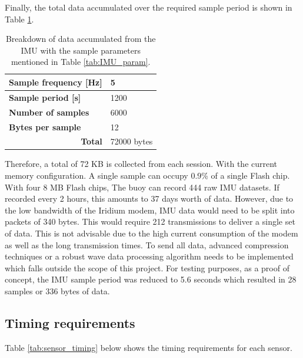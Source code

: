 Finally, the total data accumulated over the required sample period is shown in Table \ref{tab:IMU_data_total}.

\begin{table}[H]
	\centering
	\caption{Breakdown of data accumulated from the IMU with the sample parameters mentioned in Table \ref{tab:IMU_param}.}
	\setlength{\extrarowheight}{5pt}
	\begin{tabular}{ll}
		\hline
		\hline
		\textbf{Sample frequency [Hz] }  & 5\\
		\hline
		\textbf{Sample period [s]}    & 1200\\
		\hline
		\textbf{Number of samples}  & 6000 \\ 
		\hline
		\textbf{Bytes per sample}   & 12 \\
		\hline
		\hline
		\multicolumn{1}{r}{\textbf{Total}} & \multicolumn{1}{l}{72000 bytes}\\
		\cline{2-2}
	\end{tabular}
	
	\label{tab:IMU_data_total}
\end{table}

Therefore, a total of 72 KB is collected from each session. With the current memory configuration. A single sample can occupy 0.9\% of a single Flash chip. With four 8 MB Flash chips, The buoy can record 444 raw IMU datasets. If recorded every 2 hours, this amounts to 37 days worth of data. However, due to the low bandwidth of the Iridium modem, IMU data would need to be split into packets of 340 bytes. This would require 212 transmissions to deliver a single set of data. This is not advisable due to the high current consumption of the modem as well as the long transmission times. To send all data, advanced compression techniques or a robust wave data processing algorithm needs to be implemented which falls outside the scope of this project. For testing purposes, as a proof of concept, the IMU sample period was reduced to 5.6 seconds which resulted in 28 samples or 336 bytes of data.

\subsection{Timing requirements}
\label{subsec:ch5_timing}


Table \ref{tab:sensor_timing} below shows the timing requirements for each sensor.

